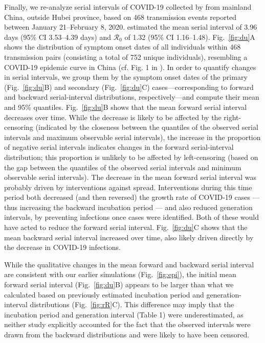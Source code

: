 \documentclass[12pt]{article}
\newcommand{\fref}[1]{Fig.~\ref{fig:#1}}
\newcommand{\Rx}[1]{\ensuremath{{\mathcal R}_{#1}}\xspace}
\newcommand{\Ro}{\Rx{0}}
\begin{document}
Finally, we re-analyze serial intervals of COVID-19 collected by \cite{du2020serial} from mainland China, outside Hubei province, based on 468 transmission events reported between January 21--February 8, 2020.
\cite{du2020serial} estimated the mean serial interval of 3.96 days (95\% CI 3.53–4.39 days) and \Ro of 1.32 (95\% CI 1.16–1.48).
\fref{du}A shows the distribution of symptom onset dates of all individuals within 468 transmission pairs (consisting a total of 752 unique individuals), resembling a COVID-19 epidemic curve in China (cf. Fig. 1 in \cite{pan2020jama}).
In order to quantify changes in serial intervals, we group them by the symptom onset dates of the primary (\fref{du}B) and secondary (\fref{du}C) cases---corresponding to forward and backward serial-interval distributions, respectively---and compute their mean and 95\% quantiles.
\fref{du}B shows that the mean forward serial interval decreases over time.
While the decrease is likely to be affected by the right-censoring (indicated by the closeness between the quantiles of the observed serial intervals and maximum observable serial intervals), the increase in the proportion of negative serial intervals indicates changes in the forward serial-interval distribution;
this proportion is unlikely to be affected by left-censoring (based on the gap between the quantiles of the observed serial intervals and minimum observable serial intervals).
The decrease in the mean forward serial interval was probably driven by interventions against spread.
Interventions during this time period both decreased (and then reversed) the growth rate of COVID-19 cases --- thus increasing the backward incubation period --- and also reduced generation intervals, by preventing infections once cases were identified.
Both of these would have acted to reduce the forward serial interval.
\fref{du}C shows that the mean backward serial interval increased over time, also likely driven directly by the decrease in COVID-19 infections.

While the qualitative changes in the mean forward and backward serial interval are consistent with our earlier simulations (\fref{epi}), the initial mean forward serial interval (\fref{du}B) appears to be larger than what we calculated based on previously estimated incubation period and generation-interval distributions (\fref{rR}C).
This difference may imply that the incubation period and generation interval (Table 1) were underestimated, as neither study explicitly accounted for the fact that the observed intervals were drawn from the backward distributions and were likely to have been censored.
\end{document}
